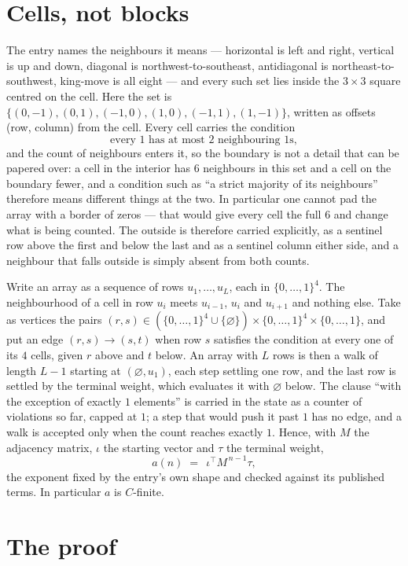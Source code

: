 \documentclass[11pt,a4paper]{article}
\theoremstyle{plain}
\theoremstyle{definition}
\begin{document}
\section{Cells, not blocks}

The entry names the neighbours it means --- horizontal is left and right, vertical is up and
down, diagonal is northwest-to-southeast, antidiagonal is northeast-to-southwest, king-move is
all eight --- and every such set lies inside the $3\times3$ square centred on the cell. Here
the set is $\{(0,-1), (0,1), (-1,0), (1,0), (-1,1), (1,-1)\}$, written as offsets (row, column) from the cell. Every cell carries
the condition
\[
\text{every 1 has at most 2 neighbouring 1s},
\]
and the count of neighbours enters it, so the boundary is not a detail that can be papered
over: a cell in the interior has $6$ neighbours in this set and a cell on the boundary
fewer, and a condition such as ``a strict majority of its neighbours'' therefore means
different things at the two. In particular one cannot pad the array with a border of zeros ---
that would give every cell the full $6$ and change what is being counted. The outside is
therefore carried
explicitly, as a sentinel row above the first and below the last and as a sentinel column
either side, and a neighbour that falls outside is simply absent from both counts.

Write an array as a sequence of rows $u_1,\dots,u_L$, each in
$\{0,\dots,1\}^{4}$. The neighbourhood of a cell in row $u_i$ meets $u_{i-1}$,
$u_i$ and $u_{i+1}$ and nothing else. Take as vertices the pairs
$(r,s)\in(\{0,\dots,1\}^{4}\cup\{\varnothing\})\times\{0,\dots,1\}^{4} \times \{0,\dots,1\}$,
and put an edge $(r,s)\to(s,t)$ when row $s$ satisfies the condition at every one of its
$4$ cells, given $r$ above and $t$ below. An array with $L$ rows is then a walk of length
$L-1$ starting at $(\varnothing,u_1)$, each step settling one row, and the last row is
settled by the terminal weight, which evaluates it with $\varnothing$ below. The clause ``with the exception of exactly $1$ elements'' is carried in
the state as a counter of violations so far, capped at $1$; a step that would push it past
$1$ has no edge, and a walk is accepted only when the count reaches exactly $1$. Hence,
with $M$ the adjacency matrix, $\iota$ the starting vector and $\tau$ the terminal weight,
\[
a(n)\;=\;\,\iota^{\!\top}M^{\,n-1}\tau ,
\]
the exponent fixed by the entry's own shape and checked against its published terms. In
particular $a$ is $C$-finite.

\section{The proof}
\end{document}
